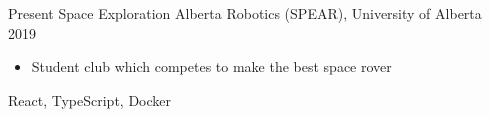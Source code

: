 
\begin{experiences}
  \experience
    {Present}   {Space Exploration Alberta Robotics (SPEAR), }{University of Alberta}{}
    {2019} {
                      \begin{itemize}
                        \item Student club which competes to make the best space rover
                      \end{itemize}
                    }
                    {
                        React,
                        TypeScript,
                        Docker
                    }
%
\end{experiences}
